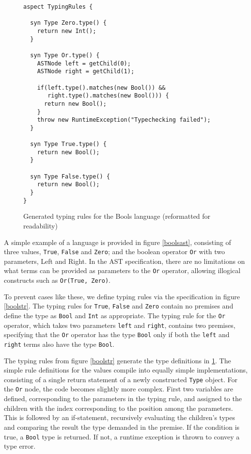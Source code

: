 \documentclass[nofilelist]{cslthse-msc}
\begin{document}
\begin{figure}[h]
\begin{lstlisting}[language=jrag]
aspect TypingRules {

  syn Type Zero.type() {
    return new Int();
  }

  syn Type Or.type() {
    ASTNode left = getChild(0);
    ASTNode right = getChild(1);

    if(left.type().matches(new Bool()) &&
       right.type().matches(new Bool())) {
      return new Bool();
    }
    throw new RuntimeException("Typechecking failed");
  }

  syn Type True.type() {
    return new Bool();
  }

  syn Type False.type() {
    return new Bool();
  }
}
\end{lstlisting}
  \caption{Generated typing rules for the Bools language (reformatted for readability)}
  \label{boolstrgen}
\end{figure}
A simple example of a language is provided in figure \ref{boolsast}, consisting of three values, \verb|True|, \verb|False| and \verb|Zero|; and the boolean operator \verb|Or| with two parameters, Left and Right.
In the AST specification, there are no limitations on what terms can be provided as parameters to the \verb|Or| operator, allowing illogical constructs such as \verb|Or(True, Zero)|.

To prevent cases like these, we define typing rules via the specification in figure \ref{boolstr}.
The typing rules for \verb|True|, \verb|False| and \verb|Zero| contain no premises and define the type as \verb|Bool| and \verb|Int| as appropriate.
The typing rule for the \verb|Or| operator, which takes two parameters \verb|left| and \verb|right|, contains two premises, specifying that the \verb|Or| operator has the type \verb|Bool| only if both the \verb|left| and \verb|right| terms also have the type \verb|Bool|.

The typing rules from figure \ref{boolstr} generate the type definitions in \ref{boolstrgen}.
The simple rule definitions for the values compile into equally simple implementations, consisting of a single return statement of a newly constructed \verb|Type| object.
For the \verb|Or| node, the code becomes slightly more complex.
First two variables are defined, corresponding to the parameters in the typing rule, and assigned to the children with the index corresponding to the position among the parameters.
This is followed by an if-statement, recursively evaluating the children's types and comparing the result the type demanded in the premise.
If the condition is true, a \verb|Bool| type is returned.
If not, a runtime exception is thrown to convey a type error.
\end{document}
